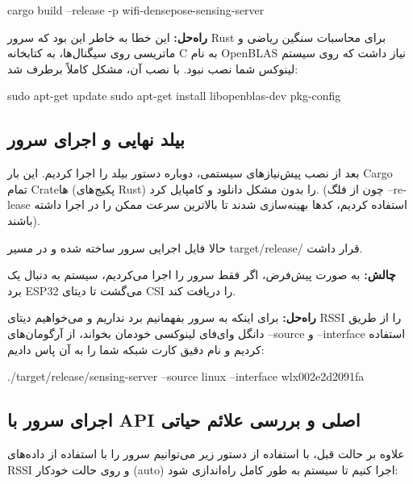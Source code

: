 \documentclass[12pt, a4paper]{article}
\newcommand{\lr}[1]{\foreignlanguage{english}{#1}}
\begin{document}
\begin{otherlanguage}{english}
\begin{terminalbox}
cargo build --release -p wifi-densepose-sensing-server
\end{terminalbox}
\end{otherlanguage}

\textbf{راه‌حل:} این خطا به خاطر این بود که سرور \lr{Rust} برای محاسبات سنگین ریاضی و ماتریسی روی سیگنال‌ها، به کتابخانه \lr{C} به نام \lr{OpenBLAS} نیاز داشت که روی سیستم لینوکس شما نصب نبود. با نصب آن، مشکل کاملاً برطرف شد:

\begin{otherlanguage}{english}
\begin{terminalbox}
sudo apt-get update
sudo apt-get install libopenblas-dev pkg-config
\end{terminalbox}
\end{otherlanguage}

\subsection{بیلد نهایی و اجرای سرور}
بعد از نصب پیش‌نیازهای سیستمی، دوباره دستور بیلد را اجرا کردیم. این بار \lr{Cargo} تمام \lr{Crate}ها (پکیج‌های \lr{Rust}) را بدون مشکل دانلود و کامپایل کرد. (چون از فلگ \lr{--release} استفاده کردیم، کدها بهینه‌سازی شدند تا بالاترین سرعت ممکن را در اجرا داشته باشند).

حالا فایل اجرایی سرور ساخته شده و در مسیر \lr{target/release/} قرار داشت.

\textbf{چالش:} به صورت پیش‌فرض، اگر فقط سرور را اجرا می‌کردیم، سیستم به دنبال یک برد \lr{ESP32} می‌گشت تا دیتای \lr{CSI} را دریافت کند.

\textbf{راه‌حل:} برای اینکه به سرور بفهمانیم برد نداریم و می‌خواهیم دیتای \lr{RSSI} را از طریق دانگل وای‌فای لینوکسی خودمان بخواند، از آرگومان‌های \lr{--source} و \lr{--interface} استفاده کردیم و نام دقیق کارت شبکه شما را به آن پاس دادیم:

\begin{otherlanguage}{english}
\begin{terminalbox}
./target/release/sensing-server --source linux --interface wlx002e2d2091fa
\end{terminalbox}
\end{otherlanguage}

\subsection{اجرای سرور با \lr{API} اصلی و بررسی علائم حیاتی}
علاوه بر حالت قبل، با استفاده از دستور زیر می‌توانیم سرور را با استفاده از داده‌های \lr{RSSI} و روی حالت خودکار (\lr{auto}) اجرا کنیم تا سیستم به طور کامل راه‌اندازی شود:
\end{document}
